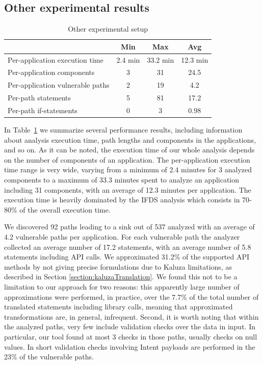 \subsection{Other experimental results}

\begin{table}[t]
\small
  \centering
  \begin{tabular}{|l|c|c|c|}
    \hline
    & Min & Max & Avg \\ \hline
    Per-application execution time & 2.4 min & 33.2 min & 12.3 min \\
    Per-application components & 3 & 31 & 24.5 \\
    Per-application vulnerable paths & 2 & 19 & 4.2 \\
    Per-path statements & 5 & 81 & 17.2 \\
    Per-path if-statements & 0 & 3 & 0.98 \\
    \hline
  \end{tabular}
  \caption{Other experimental setup}
  \label{table:other_experimental}
\end{table}

In Table~\ref{table:other_experimental} we summarize several performance results, including information about analysis execution time, path lengths and components in the applications, and so on. As it can be noted, the execution time of our whole analysis depends on the number of components of an application. The per-application
execution time range is very wide, varying from a minimum of 2.4 minutes for 3 analyzed components to a maximum of 33.3 minutes spent to analyze an
application including 31 components, with an average of 12.3 minutes per application. The execution time is heavily dominated by the IFDS analysis which consists in 70-80\% of the overall execution time.


We discovered 92 paths leading to a sink out of 537 analyzed with an average of 4.2 vulnerable paths per application. For each vulnerable path the analyzer collected an average number of 17.2 statements, with an average number of 5.8 statements including API calls. We approximated 31.2\% of the supported API methods by not giving precise formulations due to Kaluza limitations, as described in Section \ref{section:kaluzaTranslation}. We found this not to be a limitation to our approach for two reasons: this apparently large number of approximations were performed, in practice, over the 7.7\% of the total number of translated statements including library calls, meaning that approximated transformations are, in general, infrequent.
Second, it is worth noting that within the analyzed paths, very few include validation checks over the data in input. In particular, our tool found at most 3 checks in those paths, usually checks on null values. In short validation checks involving Intent payloads are performed in the 23\% of the vulnerable paths.

